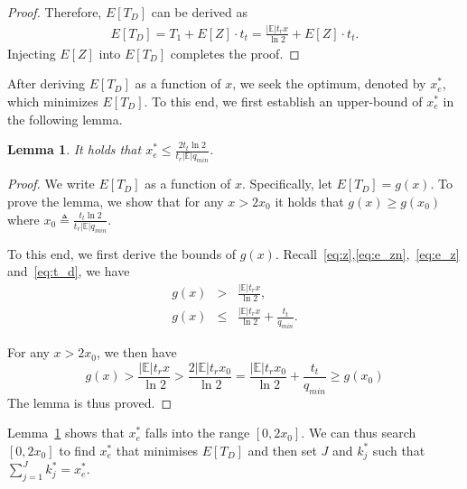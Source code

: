 \documentclass[10pt, twocolumn]{IEEEtran}
\newtheorem{lemma}{Lemma}
\begin{document}
\begin{proof}
Therefore, $E[T_D]$ can be derived as
\begin{align}
E[T_D]
= T_1 + E[Z] \cdot t_t
= \frac{|\mathbb{E}| t_r x}{\ln 2} + E[Z] \cdot t_t.
\label{eq:t_d}
\end{align}
Injecting $E[Z]$ into $E[T_D]$ completes the proof.
\end{proof}



After deriving $E[T_D]$ as a function of $x$, we seek the optimum, denoted by $x^*_e$, which minimizes $E[T_D]$. To this end, we first establish an upper-bound of $x^*_e$ in the following lemma.

\begin{lemma}
\label{Lem:x_opt_upp}
It holds that $x^*_e \le \frac{2t_t \ln2}{t_r |\mathbb{E}| q_{min}}$.
\end{lemma}

\begin{proof}
We write $E[T_D]$ as a function of $x$. Specifically, let $E[T_D]=g(x)$. To prove the lemma, we show that for any $x>2x_0$ it holds that $g(x)\ge g(x_0)$ where $x_0\triangleq \frac{t_t \ln2}{t_r |\mathbb{E}| q_{min}}$.

To this end, we first derive the bounds of $g(x)$.
Recall~\eqref{eq:z},\eqref{eq:e_zn},~\eqref{eq:e_z} and~\eqref{eq:t_d}, we have
\begin{eqnarray*}
g(x)&>&\frac{|\mathbb{E}| t_r x}{\ln 2},  \\
g(x)&\le& \frac{|\mathbb{E}| t_r x}{\ln 2} + \frac{t_t}{q_{min}}.
\end{eqnarray*}

For any $x>2x_0$, we then have
$$g(x)>\frac{|\mathbb{E}| t_r x}{\ln 2}>\frac{2|\mathbb{E}| t_r x_0}{\ln 2}=\frac{|\mathbb{E}| t_r x_0}{\ln 2} + \frac{t_t}{q_{min}}\ge g(x_0)$$
The lemma is thus proved.
\end{proof}

Lemma~\ref{Lem:x_opt_upp} shows that $x^*_e$ falls into the range $[0,2x_0]$. We can thus search $[0,2x_0]$ to find $x^*_e$ that minimises $E[T_D]$ and then set $J$ and $k_j^*$ such that $\sum_{j=1}^{J}k_j^* = x^*_e$.

\begin{comment}
\begin{algorithm}[H]
\caption{Search for the optimal value of $x$.}
\begin{algorithmic}[1]
\REQUIRE{$|\mathbb{E}|$, $|\mathbb{U}|$, $M$, $\alpha$.}
\ENSURE{the optimal value $x_{op}$. }
\STATE \textbf{Initialisation:} $E[T_D]_{min} \leftarrow \infty$;
\STATE Calculate $x^*$ following~\eqref{Eq:x*} in Lemma~\ref{Lem:Par_I};
\FOR{$x=0$ to $x^*$}
     \STATE Compute $E[T_D]$ by substituting $x$ into~\eqref{Eq:E[T_D]};
     \IF{$E[T_D] < E[T_D]_{min}$}
        \STATE $E[T_D]_{min} \leftarrow E[T_D]$;
        \STATE $x_{op} \leftarrow x$;
     \ENDIF
\ENDFOR
\STATE Return $x_{op}$;
\end{algorithmic}
\label{Al:x_op}
\end{algorithm}
\end{comment}
\end{document}
